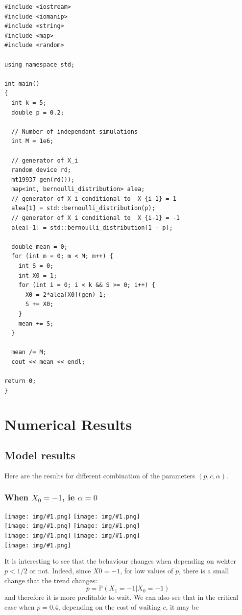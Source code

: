 \documentclass{article}
\newcommand{\IMG}[1] { \texttt{[image: img/\#1.png]} }
\begin{document}
\begin{verbatim}
#include <iostream>
#include <iomanip>
#include <string>
#include <map>
#include <random>

using namespace std;

int main()
{
  int k = 5;
  double p = 0.2;

  // Number of independant simulations
  int M = 1e6;

  // generator of X_i
  random_device rd;
  mt19937 gen(rd());
  map<int, bernoulli_distribution> alea;
  // generator of X_i conditional to  X_{i-1} = 1
  alea[1] = std::bernoulli_distribution(p);
  // generator of X_i conditional to  X_{i-1} = -1
  alea[-1] = std::bernoulli_distribution(1 - p);
  
  double mean = 0;
  for (int m = 0; m < M; m++) {
    int S = 0;
    int X0 = 1;
    for (int i = 0; i < k && S >= 0; i++) {
      X0 = 2*alea[X0](gen)-1;
      S += X0;
    }
    mean += S;
  }
  
  mean /= M;
  cout << mean << endl;
  
return 0;
}
\end{verbatim}

\newpage

\section{Numerical Results}


\subsection{Model results}
Here are the results for different combination of the parameters $(p, c, \alpha)$.
\subsubsection*{When $X_0 = -1$, ie $\alpha=0$}
\IMG{0}
\IMG{3} \\
\IMG{4} 
\IMG{7} \\
\IMG{8}
\IMG{9} \\
\IMG{10}

It is interesting to see that the behaviour changes when depending on wehter $p < 1/2$ or not. Indeed, since $X0 = -1$, for low values of $p$, there is a small change that the trend changes:
$$ p = \mathbb P (X_1 = -1 | X_0 = -1) $$
 and therefore it is more profitable to wait.
We can also see that in the critical case when $p = 0.4$, depending on the cost of waiting $c$, it may be 
\end{document}
